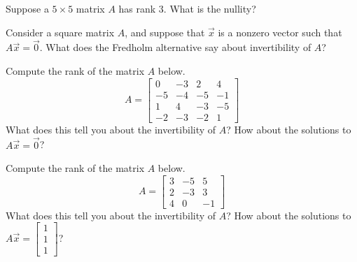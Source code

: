 \documentclass{ximera}
\begin{document}
\begin{exercise}
    Suppose a $5 \times 5$ matrix $A$ has rank 3.  What is the nullity?
\end{exercise}

\begin{exercise}
    Consider a square matrix $A$, and suppose that $\vec{x}$ is a nonzero vector such that $A \vec{x} = \vec{0}$.  What does the Fredholm alternative say about invertibility of $A$?
\end{exercise}

\begin{exercise}%
    Compute the rank of the matrix $A$ below.
    \[ A =  \begin{bmatrix} 0 & -3 & 2 & 4 \\ -5 & -4 &-5 & -1 \\ 1&4&-3 & -5\\ -2 & -3 &-2&1\end{bmatrix} \]
    What does this tell you about the invertibility of $A$? How about the solutions to $A\vec{x} = \vec{0}$? 
\end{exercise}

\begin{exercise}%
    Compute the rank of the matrix $A$ below.
    \[ A =  \begin{bmatrix} 3 & -5 & 5 \\ 2 &-3 & 3\\ 4 & 0 & -1 \end{bmatrix} \]
    What does this tell you about the invertibility of $A$? How about the solutions to $A\vec{x} = \begin{bmatrix} 1\\1\\1 \end{bmatrix}$? 
\end{exercise}
\end{document}

